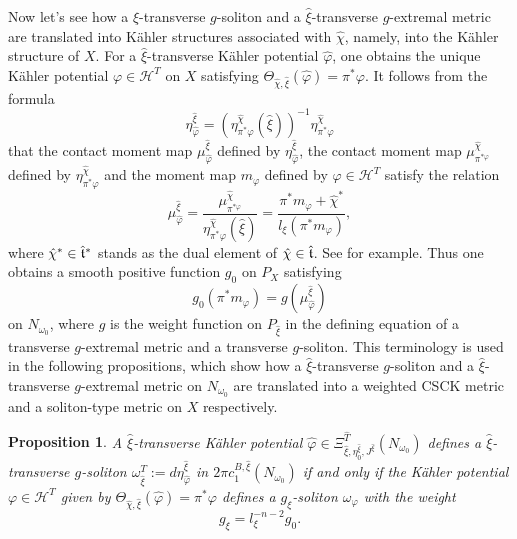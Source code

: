 \documentclass[12pt]{amsart}
\numberwithin{equation}{section}%
\theoremstyle{plain}
\newtheorem{proposition}[theorem]{Proposition}
\theoremstyle{definition}
\renewcommand{\phi}{\varphi}
\newcommand{\1}{\mathbf{1}}
\begin{document}
Now let's see
how a $\hat{\xi}$-transverse $g$-soliton and a $\hat{\xi}$-transverse
$g$-extremal metric are translated into
K\"ahler structures associated with $\hat{\chi}$, namely, 
into the K\"ahler structure of $X$.
For a $\hat{\xi}$-transverse K\"ahler potential $\hat{\phi}$,
one obtains the unique K\"ahler potential $\phi\in\mathcal{H}^{T}$ on $X$
satisfying $\Theta_{\hat{\chi},\hat{\xi}}(\hat{\phi})=\pi^{*}\phi$.
It follows from the formula 
\begin{equation}\label{eta relation}
\eta^{\hat{\xi}}_{\hat{\phi}}
=(\eta^{\hat{\chi}}_{\pi^{*}\phi}(\hat{\xi}))^{-1}\eta^{\hat{\chi}}_{\pi^{*}\phi}
\end{equation}
that the contact moment map $\mu^{\hat{\xi}}_{\hat{\phi}}$
defined by $\eta^{\hat{\xi}}_{\hat{\phi}}$,
the contact moment map $\mu^{\hat{\chi}}_{\pi^{*\phi}}$
defined by $\eta^{\hat{\chi}}_{\pi^{*}\phi}$
and the moment map $m_{\phi}$ defined by $\phi\in\mathcal{H}^{T}$
satisfy the relation
\begin{equation}
\mu^{\hat{\xi}}_{\hat{\phi}}
=\frac{\mu^{\hat{\chi}}_{\pi^{*\phi}}}{\eta^{\hat{\chi}}_{\pi^{*}\phi}(\hat{\xi})}
=\frac{\pi^{*}m_{\phi}+\hat{\chi}^{*}}{l_{\xi}(\pi^{*}m_{\phi})},
\end{equation}
where $\hat{\chi}^{*}\in\hat{\frak{t}}^{*}$ stands as the dual element of
$\hat{\chi}\in\hat{\frak{t}}$.
See \cite[Section 2.4]{CL21} for example.
Thus one obtains a smooth positive function $g_{0}$ on $P_{X}$ satisfying
\begin{equation}
g_{0}(\pi^{*}m_{\phi})=g(\mu^{\hat{\xi}}_{\hat{\phi}})
\end{equation}
on $N_{\omega_{0}}$,
where $g$ is the weight function on $P_{\hat{\xi}}$
in the defining equation of a transverse $g$-extremal metric
and a transverse $g$-soliton. 
This terminology is used in the following propositions,
which show how a $\hat{\xi}$-transverse $g$-soliton and a $\hat{\xi}$-
transverse $g$-extremal metric on $N_{\omega_{0}}$
are translated into a weighted CSCK metric and a soliton-type metric
on $X$ respectively.

\begin{proposition}\label{reg-sigma}
A $\hat{\xi}$-transverse K\"ahler potential
$\hat{\phi}\in
\Xi_{\hat{\xi},\eta^{\hat{\xi}}_{0},J^{\hat{\xi}}}^{\hat{T}}(N_{\omega_{0}})$
defines a $\hat{\xi}$-transverse $g$-soliton
$\omega_{\hat{\xi}}^{T}:=d\eta^{\hat{\xi}}_{\hat{\phi}}$
in $2\pi c^{B,\hat{\xi}}_{1}(N_{\omega_{0}})$
if and only if
the K\"ahler potential $\phi\in\mathcal{H}^{T}$
given by $\Theta_{\hat{\chi},\hat{\xi}}(\hat{\phi})=\pi^{*}\phi$
defines
a $g_{\xi}$-soliton $\omega_{\phi}$ with the weight
\begin{equation}
g_{\xi}=l_{\xi}^{-n-2}g_{0}.
\end{equation}
\end{proposition}
\end{document}

